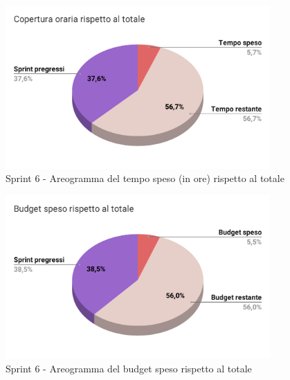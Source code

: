   \begin{figure}[H]
    \centering
    \includegraphics[width=0.90\textwidth]{assets/Consuntivo/Sprint-6/copertura_oraria.pdf}
    \caption{Sprint 6 - Areogramma del tempo speso (in ore) rispetto al totale}
  \end{figure}

  \begin{figure}[H]
    \centering
    \includegraphics[width=0.90\textwidth]{assets/Consuntivo/Sprint-6/budget_speso.pdf}
    \caption{Sprint 6 - Areogramma del budget speso rispetto al totale}
  \end{figure}

